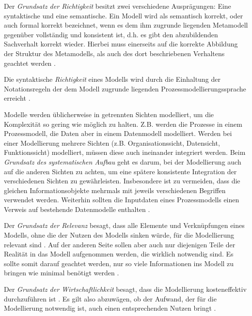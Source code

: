 Der \textit{Grundsatz der Richtigkeit} besitzt zwei verschiedene Ausprägungen: Eine syntaktische und eine semantische. Ein Modell wird als semantisch korrekt, oder auch formal korrekt bezeichnet, wenn es dem ihm zugrunde liegenden Metamodell gegenüber vollständig und konsistent ist, d.h. es gibt den abzubildenden Sachverhalt korrekt wieder. Hierbei muss einerseits auf die korrekte Abbildung der Struktur des Metamodells, als auch des dort beschriebenen Verhaltens geachtet werden \cite{journals95, becker2012prozessmanagement}. \newline

Die syntaktische \textit{Richtigkeit} eines Modells wird durch die Einhaltung der Notationsregeln der dem Modell zugrunde liegenden Prozessmodellierungssprache erreicht \cite{journals95, becker2012prozessmanagement}. \newline

Modelle werden üblicherweise in getrennten Sichten modelliert, um die Komplexität so gering wie möglich zu halten. Z.B. werden die Prozesse in einem Prozessmodell, die Daten aber in einem Datenmodell modelliert. Werden bei einer Modellierung mehrere Sichten (z.B. Organisationssicht, Datensicht, Funktionssicht) modelliert, müssen diese auch ineinander integriert werden. Beim  \textit{Grundsatz des systematischen Aufbau} geht es darum, bei der Modellierung auch auf die anderen Sichten zu achten, um eine spätere konsistente Integration der verschiedenen Sichten zu gewährleisten. Insbesondere ist zu vermeiden, dass die gleichen Informationsobjekte mehrmals mit jeweils verschiedenen Begriffen verwendet werden. Weiterhin sollten die Inputdaten eines Prozessmodells einen Verweis auf bestehende Datenmodelle enthalten \cite{journals95, freund2007, becker2012prozessmanagement,koch2011}.\newline

Der \textit{Grundsatz der Relevanz} besagt, dass alle Elemente und Verknüpfungen eines Modells, ohne die der Nutzen des Modells sinken würde, für die Modellierung relevant sind \cite{journals95, reinshagen2009}. Auf der anderen Seite sollen aber auch nur diejenigen Teile der Realität in das Modell aufgenommen werden, die wirklich notwendig sind. Es sollte somit darauf geachtet werden, nur so viele Informationen ins Modell zu bringen wie minimal benötigt werden \cite{journals95, freund2007,reinshagen2009}.\newline

Der \textit{Grundsatz der Wirtschaftlichkeit} besagt, dass die Modellierung kosteneffektiv durchzuführen ist \cite{leimeister2012}. Es gilt also abzuwägen, ob der Aufwand, der für die Modellierung notwendig ist, auch einen entsprechenden Nutzen bringt \cite{freund2007, journals95}.\newline

